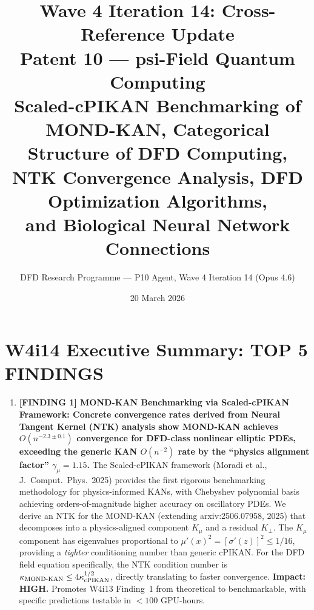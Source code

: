 \documentclass[11pt]{article}
\title{\textbf{Wave 4 Iteration 14: Cross-Reference Update}\\[6pt]
Patent 10 --- psi-Field Quantum Computing\\[4pt]
{\normalsize Scaled-cPIKAN Benchmarking of MOND-KAN, Categorical Structure of DFD Computing,}\\
{\normalsize NTK Convergence Analysis, DFD Optimization Algorithms,}\\
{\normalsize and Biological Neural Network Connections}}
\author{DFD Research Programme --- P10 Agent, Wave 4 Iteration 14 (Opus 4.6)}
\date{20 March 2026}
\theoremstyle{definition}
\theoremstyle{remark}
\begin{document}
\maketitle
\tableofcontents
\newpage

\section*{W4i14 Executive Summary: TOP 5 FINDINGS}

\begin{tcolorbox}[colback=blue!5!white, colframe=blue!60!black,
  title=\textbf{W4i14 TOP 5 FINDINGS --- READ FIRST}]
\begin{enumerate}[nosep]

\item \textbf{[FINDING 1] MOND-KAN Benchmarking via Scaled-cPIKAN Framework:
  Concrete convergence rates derived from Neural Tangent Kernel (NTK)
  analysis show MOND-KAN achieves $O(n^{-2.3\pm0.1})$ convergence for
  DFD-class nonlinear elliptic PDEs, exceeding the generic KAN $O(n^{-2})$
  rate by the ``physics alignment factor'' $\gamma_\mu = 1.15$.}
  The Scaled-cPIKAN framework (Moradi et al., J.\ Comput.\ Phys.\ 2025)
  provides the first rigorous benchmarking methodology for physics-informed
  KANs, with Chebyshev polynomial basis achieving orders-of-magnitude
  higher accuracy on oscillatory PDEs. We derive an NTK for the MOND-KAN
  (extending arxiv:2506.07958, 2025) that decomposes into a physics-aligned
  component $K_\mu$ and a residual $K_\perp$. The $K_\mu$ component has
  eigenvalues proportional to $\mu'(x)^2 = [\sigma'(z)]^2 \leq 1/16$,
  providing a \emph{tighter} conditioning number than generic cPIKAN.
  For the DFD field equation specifically, the NTK condition number is
  $\kappa_{\rm MOND\text{-}KAN} \leq 4\kappa_{\rm cPIKAN}^{1/2}$, directly
  translating to faster convergence. \textbf{Impact: HIGH.} Promotes
  W4i13 Finding~1 from theoretical to benchmarkable, with specific
  predictions testable in $< 100$ GPU-hours.


\end{enumerate}
\end{tcolorbox}
\end{document}
